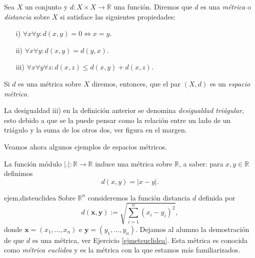 \begin{definicion}{} Sea $X$ un conjunto y $d:X\times X\rightarrow
\mathbb{R}$ una función. Diremos que $d$ es una \emph{métrica} o \emph{distancia}
sobre $X$ si satisface las siguientes propiedades:
	  \begin{itemize}
		   \item[i)]$\forall x \forall y: d(x,y)=0\Leftrightarrow x=y$.
		   \item[ii)] $\forall x \forall y : d(x,y)=d(y,x)$.
		   \item[iii)]$\forall x \forall y \forall z: d(x,z)\leq
				d(x,y)+d(x,z)$.
	  \end{itemize}
Si $d$ es una métrica sobre $X$ diremos, entonces, que el par
$(X,d)$ es un \emph{espacio métrico}.
\end{definicion}
La desigualdad iii) en la definición anterior se denomina
\emph{desigualdad triágular}, esto debido a que se la puede
pensar como la relación entre un lado de un triágulo y la suma
de los otros dos, ver figura  en el margen.




Veamos ahora algunos ejemplos de espacios métricos.

\begin{ejemplo}{} La función módulo $|.|:\mathbb{R}\rightarrow
\mathbb{R}$ induce una métrica sobre $\mathbb{R}$, a saber: para
$x,y\in\mathbb{R}$ definimos
\begin{equation}\label{distmod}
	d(x,y)=|x-y|.
\end{equation}
\end{ejemplo}

\begin{ejemplo}{ejem,disteuclidea} Sobre $\mathbb{R}^n$
consideremos la función
distancia $d$ definida por
\begin{equation}\label{meteuclidea}
	d(\mathbf{x},\mathbf{y}):=\sqrt{\sum\limits_{i=1}^{n}(x_i-y_i)^2},
\end{equation}
donde $\mathbf{x}=(x_1,\dots,x_n)$ e $\mathbf{y}=(y_1,\dots,y_n)$.
Dejamos al alumno la demostración de que $d$ es una métrica,
ver Ejercicio \vref{ejmeteuclidea}. Esta métrica es conocida
como \emph{métrica euclidea} y es la métrica con la que estamos más familiarizados.
\end{ejemplo}



